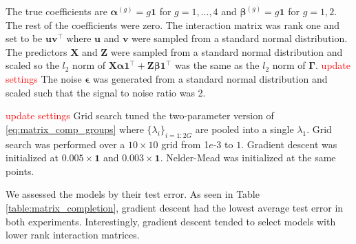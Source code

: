 \documentclass[12pt]{article}
\begin{document}
The true coefficients are $\boldsymbol{\alpha}^{(g)} = g \boldsymbol{1}$ for $g = 1,...,4$ and $\boldsymbol{\beta}^{(g)} = g \boldsymbol{1}$ for $g = 1,2$. The rest of the coefficients were zero. The interaction matrix was rank one and set to be $\boldsymbol{u}\boldsymbol{v}^\top$ where $\boldsymbol{u}$ and $\boldsymbol{v}$ were sampled from a standard normal distribution. The predictors $\boldsymbol X$ and $\boldsymbol{Z}$ were sampled from a standard normal distribution and scaled so the $l_2$ norm of $\boldsymbol{X}\boldsymbol{\alpha}\boldsymbol{1}^\top + \boldsymbol{Z}\boldsymbol{\beta}\boldsymbol{1}^\top$ was the same as the $l_2$ norm of $\boldsymbol{\Gamma}$. \textcolor{red}{update settings}
The noise $\boldsymbol \epsilon$ was generated from a standard normal distribution and scaled such that the signal to noise ratio was 2. 


\textcolor{red}{update settings}
Grid search tuned the two-parameter version of \eqref{eq:matrix_comp_groups} where $\{\lambda_i\}_{i=1:2G}$ are pooled into a single $\lambda_1$. Grid search was performed over a $10 \times 10$ grid from 1$e$-3 to $1$. Gradient descent was initialized at $0.005 \times \boldsymbol 1$ and $0.003 \times \boldsymbol 1$. Nelder-Mead was initialized at the same points.

We assessed the models by their test error. As seen in Table \ref{table:matrix_completion}, gradient descent had the lowest average test error in both experiments. Interestingly, gradient descent tended to select models with lower rank interaction matrices.
\end{document}
